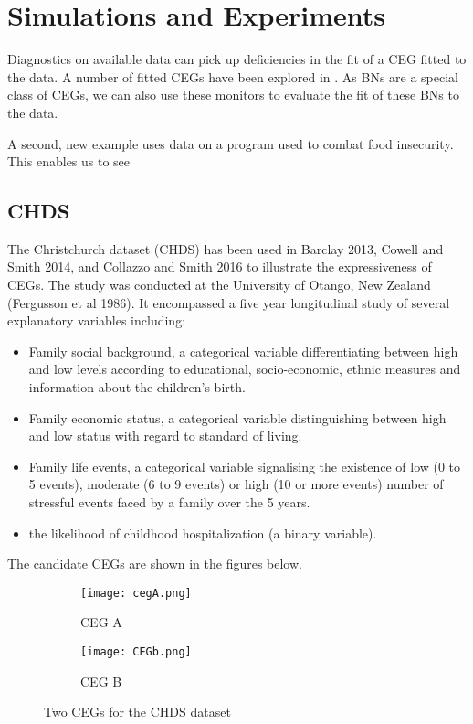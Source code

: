 \documentclass[12pt]{article}
\begin{document}
\section{Simulations and Experiments}

Diagnostics on available data can pick up deficiencies in the fit of a CEG fitted to the data. A number of fitted CEGs have been explored in \cite{CEGbook}. As BNs are a special class of CEGs, we can also use these monitors to evaluate the fit of these BNs to the data. 

A second, new example uses data on a program used to combat food insecurity. This enables us to see 


\subsection{CHDS}

The Christchurch dataset (CHDS) has been used in Barclay 2013, Cowell and Smith 2014, and Collazzo and Smith 2016 to illustrate the expressiveness of CEGs. The study was conducted at the University of Otango, New Zealand (Fergusson et al 1986). It encompassed a five year longitudinal study of several explanatory variables including: 

\begin{itemize}
	\item Family social background, a categorical variable differentiating between high and low levels according to educational, socio-economic, ethnic measures and information about the children’s birth.
	\item Family economic status, a categorical variable distinguishing between high and
	low status with regard to standard of living.
	\item Family life events, a categorical variable signalising the existence of low (0 to 5 events), moderate (6 to 9 events) or high (10 or more events) number of stressful events faced by a family over the 5 years.
	\item the likelihood of childhood hospitalization (a binary variable). 
\end{itemize}


The candidate CEGs are shown in the figures below. 

\begin{figure}
\centering
\begin{subfigure}{.5\textwidth}
  \centering
  \texttt{[image: cegA.png]}
  \caption{CEG A}
  \label{fig:CEGa}
\end{subfigure}%
\begin{subfigure}{.5\textwidth}
  \centering
  \texttt{[image: CEGb.png]}
  \caption{CEG B}
  \label{fig:CEGb}
\end{subfigure}
\caption{Two CEGs for the CHDS dataset}
\label{fig:test}
\end{figure}
\end{document}
